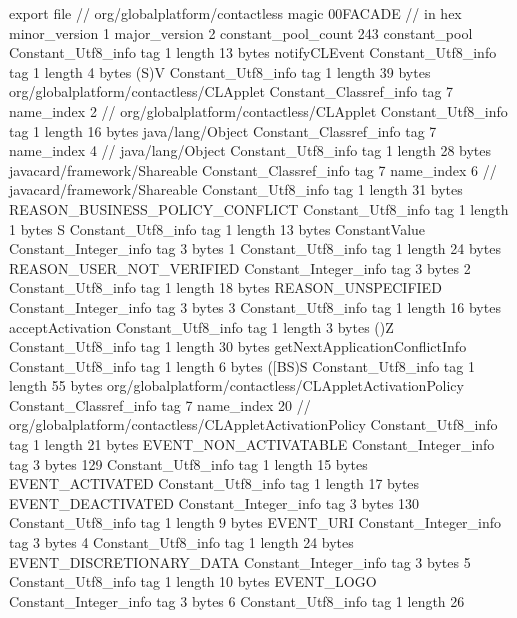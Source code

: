 export file {		// org/globalplatform/contactless
	magic	00FACADE		 // in hex
	minor_version	1
	major_version	2
	constant_pool_count	243
	constant_pool {
		Constant_Utf8_info {
			tag	1
			length	13
			bytes	notifyCLEvent
		}
		Constant_Utf8_info {
			tag	1
			length	4
			bytes	(S)V
		}
		Constant_Utf8_info {
			tag	1
			length	39
			bytes	org/globalplatform/contactless/CLApplet
		}
		Constant_Classref_info {
			tag	7
			name_index	2		// org/globalplatform/contactless/CLApplet
		}
		Constant_Utf8_info {
			tag	1
			length	16
			bytes	java/lang/Object
		}
		Constant_Classref_info {
			tag	7
			name_index	4		// java/lang/Object
		}
		Constant_Utf8_info {
			tag	1
			length	28
			bytes	javacard/framework/Shareable
		}
		Constant_Classref_info {
			tag	7
			name_index	6		// javacard/framework/Shareable
		}
		Constant_Utf8_info {
			tag	1
			length	31
			bytes	REASON_BUSINESS_POLICY_CONFLICT
		}
		Constant_Utf8_info {
			tag	1
			length	1
			bytes	S
		}
		Constant_Utf8_info {
			tag	1
			length	13
			bytes	ConstantValue
		}
		Constant_Integer_info {
			tag	3
			bytes	1
		}
		Constant_Utf8_info {
			tag	1
			length	24
			bytes	REASON_USER_NOT_VERIFIED
		}
		Constant_Integer_info {
			tag	3
			bytes	2
		}
		Constant_Utf8_info {
			tag	1
			length	18
			bytes	REASON_UNSPECIFIED
		}
		Constant_Integer_info {
			tag	3
			bytes	3
		}
		Constant_Utf8_info {
			tag	1
			length	16
			bytes	acceptActivation
		}
		Constant_Utf8_info {
			tag	1
			length	3
			bytes	()Z
		}
		Constant_Utf8_info {
			tag	1
			length	30
			bytes	getNextApplicationConflictInfo
		}
		Constant_Utf8_info {
			tag	1
			length	6
			bytes	([BS)S
		}
		Constant_Utf8_info {
			tag	1
			length	55
			bytes	org/globalplatform/contactless/CLAppletActivationPolicy
		}
		Constant_Classref_info {
			tag	7
			name_index	20		// org/globalplatform/contactless/CLAppletActivationPolicy
		}
		Constant_Utf8_info {
			tag	1
			length	21
			bytes	EVENT_NON_ACTIVATABLE
		}
		Constant_Integer_info {
			tag	3
			bytes	129
		}
		Constant_Utf8_info {
			tag	1
			length	15
			bytes	EVENT_ACTIVATED
		}
		Constant_Utf8_info {
			tag	1
			length	17
			bytes	EVENT_DEACTIVATED
		}
		Constant_Integer_info {
			tag	3
			bytes	130
		}
		Constant_Utf8_info {
			tag	1
			length	9
			bytes	EVENT_URI
		}
		Constant_Integer_info {
			tag	3
			bytes	4
		}
		Constant_Utf8_info {
			tag	1
			length	24
			bytes	EVENT_DISCRETIONARY_DATA
		}
		Constant_Integer_info {
			tag	3
			bytes	5
		}
		Constant_Utf8_info {
			tag	1
			length	10
			bytes	EVENT_LOGO
		}
		Constant_Integer_info {
			tag	3
			bytes	6
		}
		Constant_Utf8_info {
			tag	1
			length	26
}}}
